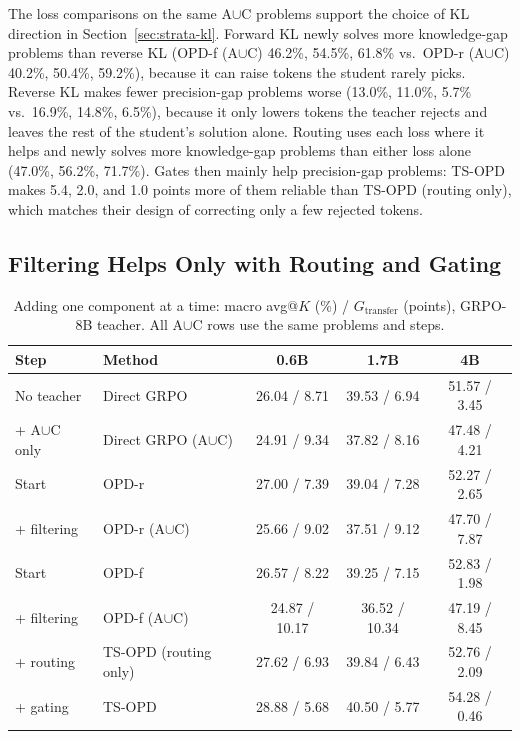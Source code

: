 \documentclass[10pt]{article}
\makeatletter
\newcommand{\avgk}{avg@$K$}
\newcommand{\tsopd}{TS-OPD}
\newcommand{\tsro}{TS-OPD (routing only)}
\newcommand{\AC}{A$\cup$C}
\newcommand{\Gt}{G_{\mathrm{transfer}}}
\makeatother
\begin{document}
The loss comparisons on the same \AC{} problems support the choice of KL
direction in Section~\ref{sec:strata-kl}. Forward KL newly solves more
knowledge-gap problems than reverse KL (OPD-f (\AC) 46.2\%, 54.5\%, 61.8\% vs.\
OPD-r (\AC) 40.2\%, 50.4\%, 59.2\%), because it can raise tokens the student
rarely picks. Reverse KL makes fewer precision-gap problems worse (13.0\%,
11.0\%, 5.7\% vs.\ 16.9\%, 14.8\%, 6.5\%), because it only lowers tokens the
teacher rejects and leaves the rest of the student's solution alone. Routing
uses each loss where it helps and newly solves more knowledge-gap problems than
either loss alone (47.0\%, 56.2\%, 71.7\%). Gates then mainly help precision-gap
problems: \tsopd{} makes 5.4, 2.0, and 1.0 points more of them reliable than
\tsro{}, which matches their design of correcting only a few rejected tokens.

\subsection{Filtering Helps Only with Routing and Gating}
\label{sec:exp-components}

\begin{table}[t]
\centering
\small
\caption{Adding one component at a time: macro \avgk{} (\%) / $\Gt$ (points),
GRPO-8B teacher. All \AC{} rows use the same problems and steps.}
\label{tab:rq5}
\begin{tabular}{llccc}
\toprule
Step & Method & 0.6B & 1.7B & 4B \\
\midrule
No teacher & Direct GRPO & 26.04 / 8.71 & 39.53 / 6.94 & 51.57 / 3.45 \\
\quad + \AC{} only & Direct GRPO (\AC) & 24.91 / 9.34 & 37.82 / 8.16 & 47.48 / 4.21 \\
\midrule
Start & OPD-r & 27.00 / 7.39 & 39.04 / 7.28 & 52.27 / 2.65 \\
\quad + filtering & OPD-r (\AC) & 25.66 / 9.02 & 37.51 / 9.12 & 47.70 / 7.87 \\
Start & OPD-f & 26.57 / 8.22 & 39.25 / 7.15 & 52.83 / 1.98 \\
\quad + filtering & OPD-f (\AC) & 24.87 / 10.17 & 36.52 / 10.34 & 47.19 / 8.45 \\
\quad + routing & \tsro{} & 27.62 / 6.93 & 39.84 / 6.43 & 52.76 / 2.09 \\
\quad + gating & \tsopd{} & 28.88 / 5.68 & 40.50 / 5.77 & 54.28 / 0.46 \\
\bottomrule
\end{tabular}

\end{table}
\end{document}
